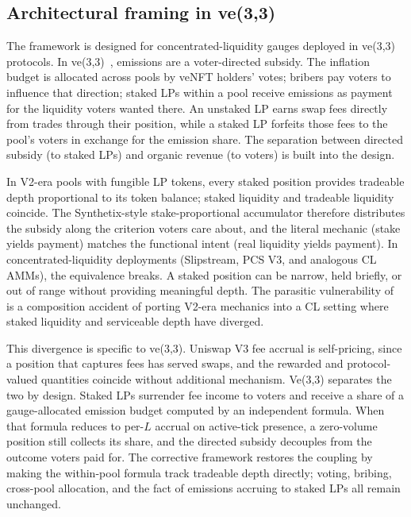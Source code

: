 \documentclass[11pt,a4paper]{article}
\theoremstyle{cgdefinition}
\theoremstyle{cgplain}
\theoremstyle{cgremark}
\begin{document}
\subsection{Architectural framing in ve(3,3)}\label{sec:ve33}

The framework is designed for concentrated-liquidity gauges deployed in ve(3,3) protocols. In ve(3,3)~\cite{cronje2022}, emissions are a voter-directed subsidy. The inflation budget is allocated across pools by veNFT holders' votes; bribers pay voters to influence that direction; staked LPs within a pool receive emissions as payment for the liquidity voters wanted there. An unstaked LP earns swap fees directly from trades through their position, while a staked LP forfeits those fees to the pool's voters in exchange for the emission share. The separation between directed subsidy (to staked LPs) and organic revenue (to voters) is built into the design.

In V2-era pools with fungible LP tokens, every staked position provides tradeable depth proportional to its token balance; staked liquidity and tradeable liquidity coincide. The Synthetix-style stake-proportional accumulator therefore distributes the subsidy along the criterion voters care about, and the literal mechanic (stake yields payment) matches the functional intent (real liquidity yields payment). In concentrated-liquidity deployments (Slipstream, PCS V3, and analogous CL AMMs), the equivalence breaks. A staked position can be narrow, held briefly, or out of range without providing meaningful depth. The parasitic vulnerability of~\cite{ryan2026c} is a composition accident of porting V2-era mechanics into a CL setting where staked liquidity and serviceable depth have diverged.

This divergence is specific to ve(3,3). Uniswap V3 fee accrual is self-pricing, since a position that captures fees has served swaps, and the rewarded and protocol-valued quantities coincide without additional mechanism. Ve(3,3) separates the two by design. Staked LPs surrender fee income to voters and receive a share of a gauge-allocated emission budget computed by an independent formula. When that formula reduces to per-$L$ accrual on active-tick presence, a zero-volume position still collects its share, and the directed subsidy decouples from the outcome voters paid for. The corrective framework restores the coupling by making the within-pool formula track tradeable depth directly; voting, bribing, cross-pool allocation, and the fact of emissions accruing to staked LPs all remain unchanged.
\end{document}
